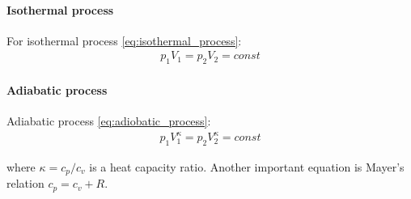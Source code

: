 \documentclass[class=article, crop=false]{standalone}
\begin{document}
\paragraph{Isothermal process}
For isothermal process \ref{eq:isothermal_process}:
\begin{align}
    p_1 V_1 = p_2 V_2 = const
    \label{eq:isothermal_process}
\end{align}

\paragraph{Adiabatic process}

Adiabatic process \ref{eq:adiobatic_process}:
\begin{align}
     p_1V_1^{\kappa} =  p_2V_2^{\kappa} = const
    \label{eq:adiobatic_process}
\end{align}

where $\kappa = c_p/c_v$ is a heat capacity ratio. Another
important equation is Mayer's relation $c_p = c_v + R$.
\end{document}
